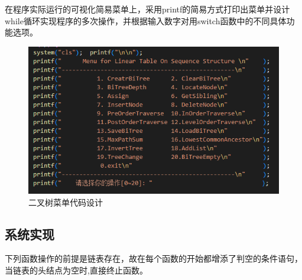 \documentclass[supercite]{Experimental_Report}
\theoremstyle{definition}
\begin{document}
在程序实际运行的可视化简易菜单上，采用printf的简易方式打印出菜单并设计while循环实现程序的多次操作，并根据输入数字对用switch函数中的不同具体功能选项。
\begin{figure}[htb]
	\begin{center}
		\includegraphics[scale=0.50]{images/menu.png}
		\caption{二叉树菜单代码设计}
		\label{fig2-1}
	\end{center}
\end{figure}
\subsection{系统实现}
下列函数操作的前提是链表存在，故在每个函数的开始都增添了判空的条件语句，当链表的头结点为空时,直接终止函数。
\end{document}
